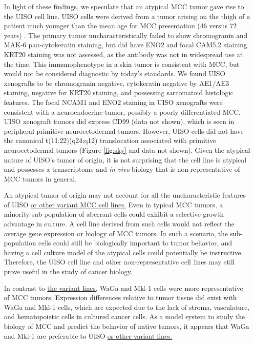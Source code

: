 \documentclass[10pt]{article}
\begin{document}
In light of these findings, we speculate that an atypical MCC tumor gave rise to the UISO cell line.
UISO cells were derived from a tumor arising on the thigh of a patient much younger than the mean age for MCC presentation (46 versus 72 years) \citep{Ronan1993Merkel}.
The primary tumor uncharacteristically failed to show chromogranin and MAK-6 pan-cytokeratin staining, but did have ENO2 and focal CAM5.2 staining.
KRT20 staining was not assessed, as the antibody was not in widespread use at the time.
This immunophenotype in a skin tumor is consistent with MCC, but would not be considered diagnostic by today's standards.
We found UISO xenografts to be chromogranin negative, cytokeratin negative by AE1/AE3 staining, negative for KRT20 staining, and possessing sarcomatoid histologic features.
The focal NCAM1 and ENO2 staining in UISO xenografts were consistent with a neuroendocrine tumor, possibly a poorly differentiated MCC.
UISO xenograft tumors did express CD99 (data not shown), which is seen in peripheral primitive neuroectodermal tumors.
However, UISO cells did not have the canonical t(11;22)(q24;q12) translocation associated with primitive neuroectodermal tumors (Figure \ref{fig:sky} and data not shown)\citep{TurcCarel1988Chromosomes}.
Given the atypical nature of UISO’s tumor of origin, it is not surprising that the cell line is atypical and possesses a transcriptome and \emph{in vivo} biology that is non-representative of MCC tumors in general.

An atypical tumor of origin may not account for all the uncharacteristic features of UISO \uline{or other variant MCC cell lines.}
Even in typical MCC tumors, a minority sub-population of aberrant cells could exhibit a selective growth advantage in culture.
A cell line derived from such cells would not reflect the average gene expression or biology of MCC tumors.
In such a scenario, the sub-population cells could still be biologically important to tumor behavior, and having a cell culture model of the atypical cells could potentially be instructive.
Therefore, the UISO cell line and other non-representative cell lines may still prove useful in the study of cancer biology.

In contrast to \uline{the variant lines,} WaGa and Mkl-1 cells were more representative of MCC tumors.
Expression differences relative to tumor tissue did exist with WaGa and Mkl-1 cells, which are expected due to the lack of stroma, vasculature, and hematopoietic cells in cultured cancer cells.
As a model system to study the biology of MCC and predict the behavior of native tumors, it appears that WaGa and Mkl-1 are preferable to UISO \uline{or other variant lines.}
\end{document}
